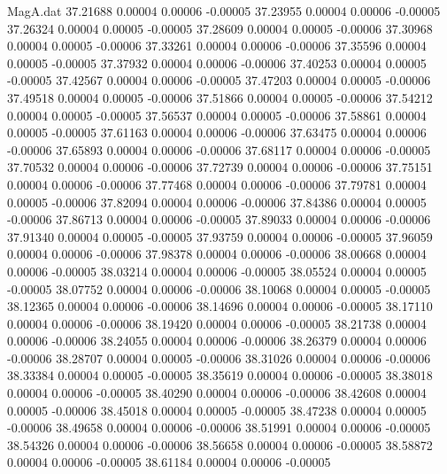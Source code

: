 \begin{filecontents}{MagA.dat}
  37.21688    0.00004    0.00006   -0.00005
  37.23955    0.00004    0.00006   -0.00005
  37.26324    0.00004    0.00005   -0.00005
  37.28609    0.00004    0.00005   -0.00006
  37.30968    0.00004    0.00005   -0.00006
  37.33261    0.00004    0.00006   -0.00006
  37.35596    0.00004    0.00005   -0.00005
  37.37932    0.00004    0.00006   -0.00006
  37.40253    0.00004    0.00005   -0.00005
  37.42567    0.00004    0.00006   -0.00005
  37.47203    0.00004    0.00005   -0.00006
  37.49518    0.00004    0.00005   -0.00006
  37.51866    0.00004    0.00005   -0.00006
  37.54212    0.00004    0.00005   -0.00005
  37.56537    0.00004    0.00005   -0.00006
  37.58861    0.00004    0.00005   -0.00005
  37.61163    0.00004    0.00006   -0.00006
  37.63475    0.00004    0.00006   -0.00006
  37.65893    0.00004    0.00006   -0.00006
  37.68117    0.00004    0.00006   -0.00005
  37.70532    0.00004    0.00006   -0.00006
  37.72739    0.00004    0.00006   -0.00006
  37.75151    0.00004    0.00006   -0.00006
  37.77468    0.00004    0.00006   -0.00006
  37.79781    0.00004    0.00005   -0.00006
  37.82094    0.00004    0.00006   -0.00006
  37.84386    0.00004    0.00005   -0.00006
  37.86713    0.00004    0.00006   -0.00005
  37.89033    0.00004    0.00006   -0.00006
  37.91340    0.00004    0.00005   -0.00005
  37.93759    0.00004    0.00006   -0.00005
  37.96059    0.00004    0.00006   -0.00006
  37.98378    0.00004    0.00006   -0.00006
  38.00668    0.00004    0.00006   -0.00005
  38.03214    0.00004    0.00006   -0.00005
  38.05524    0.00004    0.00005   -0.00005
  38.07752    0.00004    0.00006   -0.00006
  38.10068    0.00004    0.00005   -0.00005
  38.12365    0.00004    0.00006   -0.00006
  38.14696    0.00004    0.00006   -0.00005
  38.17110    0.00004    0.00006   -0.00006
  38.19420    0.00004    0.00006   -0.00005
  38.21738    0.00004    0.00006   -0.00006
  38.24055    0.00004    0.00006   -0.00006
  38.26379    0.00004    0.00006   -0.00006
  38.28707    0.00004    0.00005   -0.00006
  38.31026    0.00004    0.00006   -0.00006
  38.33384    0.00004    0.00005   -0.00005
  38.35619    0.00004    0.00006   -0.00005
  38.38018    0.00004    0.00006   -0.00005
  38.40290    0.00004    0.00006   -0.00006
  38.42608    0.00004    0.00005   -0.00006
  38.45018    0.00004    0.00005   -0.00005
  38.47238    0.00004    0.00005   -0.00006
  38.49658    0.00004    0.00006   -0.00006
  38.51991    0.00004    0.00006   -0.00005
  38.54326    0.00004    0.00006   -0.00006
  38.56658    0.00004    0.00006   -0.00005
  38.58872    0.00004    0.00006   -0.00005
  38.61184    0.00004    0.00006   -0.00005

\end{filecontents}
